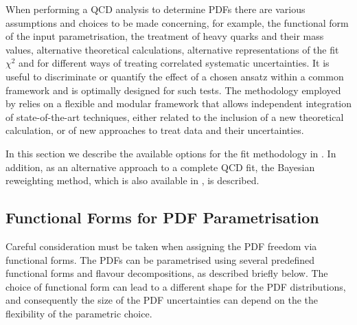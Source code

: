 


When performing a QCD analysis to determine PDFs there are various assumptions and choices to be made concerning, for example, the functional form of the input parametrisation, the treatment of heavy quarks and their mass values, alternative theoretical calculations, alternative representations of the fit $\chi^2$ and for different ways of treating correlated systematic uncertainties.
%
 It is useful to discriminate or quantify the effect of a chosen ansatz within a common framework and 
\fitter is optimally designed for such tests.
%
The methodology employed by \fitter  relies on a flexible and modular
framework that allows independent integration of state-of-the-art techniques, either related to the inclusion of a new theoretical calculation, or of new approaches to treat data and their uncertainties. 

In this section we describe the available options for the fit methodology in \fitter.
%
In addition, as an alternative approach to a complete QCD fit, the Bayesian reweighting
method, which is also available in \fitter, is described.
\subsection{Functional Forms for PDF Parametrisation}

Careful consideration must be taken when assigning the PDF freedom via functional forms. The PDFs can be parametrised using several predefined functional forms and 
flavour decompositions, as described briefly below. The choice of functional form can lead to a different shape for the PDF distributions, and consequently the size 
of the PDF uncertainties can depend on the the flexibility of the parametric choice.
